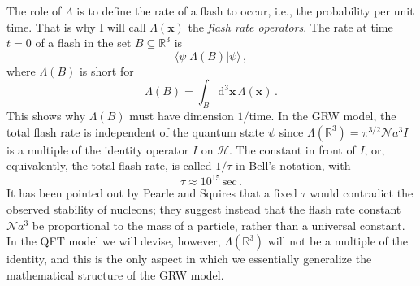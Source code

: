 \documentclass[12pt]{article}
\newcommand{\RRR}{\mathbb{R}}
\newcommand{\Hilbert}{\mathscr{H}}
\renewcommand{\sp}[2]{\langle #1 | #2 \rangle}
\newcommand{\vx}{\boldsymbol{x}}
\newcommand{\D}{\mathrm{d}} %
\newcommand{\1}{1}
\newcommand{\nconst}{\mathcal{N}}
\newcommand{\z}[1]{{#1}}
\begin{document}
The role of $\Lambda$ is to define the rate of a flash to occur, i.e., the probability per unit time. That is why I will call $\Lambda(\vx)$ the \emph{flash rate operators}. The rate at time $t=0$ of a flash in the set $B \subseteq \RRR^3$ is
\begin{equation}\label{rateB}
  \sp{\psi}{\Lambda(B)|\psi} \,,
\end{equation}
where $\Lambda(B)$ is short for
\begin{equation}
  \Lambda(B) = \int_B \D^3 \vx \, \Lambda(\vx) \,.
\end{equation}
This shows \z{why} $\Lambda(B)$ must have dimension $1/$time. In the GRW model, the total flash rate is independent of the quantum state $\psi$ since $\Lambda(\RRR^3) = \pi^{3/2}\nconst a^3 I$ is a multiple of the identity operator $I$ on $\Hilbert$. The constant in front of $I$, or, equivalently, the total flash rate, is called $1/\tau$ in Bell's \cite{Belljumps} notation, with
\begin{equation}
  \tau \approx 10^{15} \, \mathrm{sec} \,.
\end{equation}
\z{It has been pointed out by Pearle and Squires \cite{PS94} that a fixed $\tau$ would contradict the observed stability of nucleons; they suggest instead that the flash rate constant $\nconst a^3$ be proportional to the mass of a particle, rather than a universal constant.} In the QFT model we will devise, \z{however,} $\Lambda(\RRR^3)$ will not be a multiple of the identity, and this is the only aspect in which we essentially generalize the mathematical structure of the GRW model.
\end{document}

